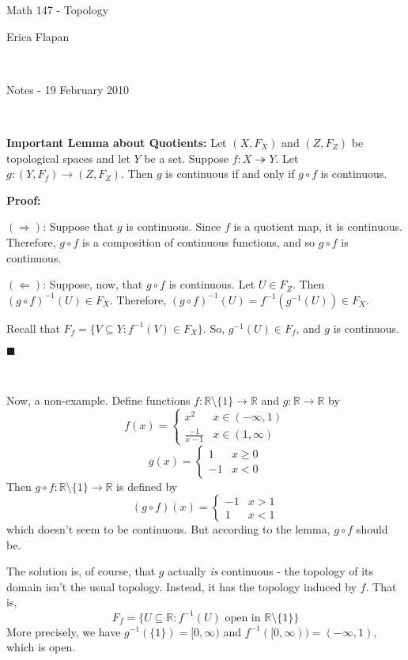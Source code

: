 \documentclass[11pt]{amsart}
\newcommand{\onto}{\twoheadrightarrow}
\newcommand{\R}{\mathbb R}
\begin{document}
\begin{center}
\LARGE{Math 147 - Topology}

\large{Erica Flapan}

\mbox{ }

\large{Notes - 19 February 2010}
\end{center}

\mbox{ }

{\bf Important Lemma about Quotients: } 
Let $(X, F_X)$ and $(Z, F_Z)$ be topological spaces and let $Y$ be a set.  Suppose $f:X\onto Y$.  Let $g:(Y, F_f)\to(Z, F_Z)$.  Then $g$ is continuous if and only if $g\circ f$ is continuous.

{\bf Proof: }

$(\Rightarrow)$: Suppose that $g$ is continuous.  Since $f$ is a quotient map, it is continuous.  Therefore, $g\circ f$ is a composition of continuous functions, and so $g\circ f$ is continuous.

$(\Leftarrow)$:  Suppose, now, that $g\circ f$ is continuous.  Let $U\in F_Z$.  Then $(g\circ f)^{-1}(U)\in F_X$.  Therefore, $(g\circ f)^{-1}(U) = f^{-1}(g^{-1}(U)) \in F_X$.
 
 Recall that $F_f = \{ V\subseteq Y : f^{-1}(V)\in F_X\}$.  So, $g^{-1}(U) \in F_f$, and $g$ is continuous.  \begin{flushright}$\blacksquare$\end{flushright}

\mbox{ }

Now, a non-example.  Define functions $f:\R\setminus\{1\}\to\R$ and $g:\R\to\R$ by
\[ f(x) = \begin{cases} x^2 & x\in(-\infty, 1) \\ \frac{-1}{x-1} & x\in (1, \infty) \end{cases} \]
\[ g(x) = \begin{cases}  1 &  x\ge 0 \\  -1 & x < 0 \end{cases} \]
Then $g\circ f : \R\setminus\{1\}\to\R$ is defined by
\[ (g\circ f)(x) = \begin{cases} -1 & x > 1 \\ 1 & x < 1 \end{cases} \]
which doesn't seem to be continuous.  But according to the lemma, $g\circ f$ should be.  

The solution is, of course, that $g$ actually \emph{is} continuous - the topology of its domain isn't the usual topology.  Instead, it has the topology induced by $f$.  That is, 
\[F_f = \{ U\subseteq \R : f^{-1}(U)\text{ open in }\R\setminus\{1\} \}\]
More precisely, we have $g^{-1}(\{ 1\}) = [0, \infty)$ and $f^{-1}([0, \infty)) = (-\infty,1)$, which is open.
\end{document}
